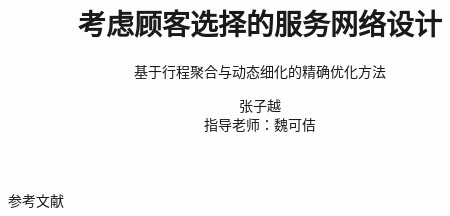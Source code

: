 \documentclass[aspectratio=169]{ctexbeamer}
\title[考虑顾客选择的服务网络设计]{考虑顾客选择的服务网络设计}
\subtitle{基于行程聚合与动态细化的精确优化方法}
\author[张子越]{张子越 \\ {\small 指导老师：魏可佶}}
\institute[同济大学]{同济大学经济与管理学院}
\date{}
\begin{document}
\begin{frame}
    \titlepage
\end{frame}







\begin{frame}{参考文献}
    \printbibliography
\end{frame}
\end{document}
